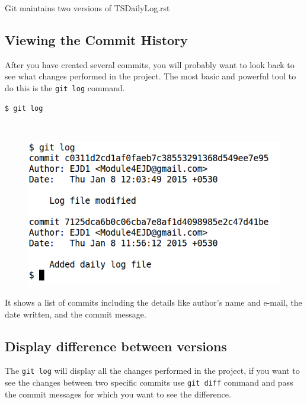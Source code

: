 \documentclass[11pt,a4paper]{article}
\begin{document}
Git maintains two versions of TSDailyLog.rst
\subsection*{Viewing the Commit History}
After you have created several commits, you will probably want to look back to see what changes performed in the project. The most basic and powerful tool to do this is the \texttt{git log} command.
 
\begin{verbatim}
$ git log
\end{verbatim}
\vfill{\ }
\begin{figure}[H]
    \begin{center}
        \includegraphics[scale=0.5]{log1.png}
      \end{center}
    \end{figure}

It shows a list of commits including the details like author’s name and e-mail, the date written, and the commit message.
\subsection*{Display difference between versions}
The \texttt{git log} will display all the changes performed in the project, if you want to see the changes between two specific commits use \texttt{git diff} command and pass the commit messages for which you want to see the difference.
\end{document}
